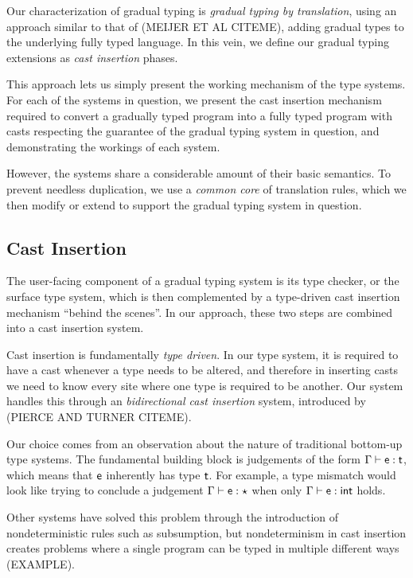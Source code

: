 \documentclass[preprint]{sigplanconf}
\newcommand{\e}{\M{\xt{e}}}
\renewcommand{\t}{\M{\xt{t}}}
\newcommand{\any}{\M{\star}}
\newcommand{\M}[1]{\ensuremath{#1}\xspace}
\newcommand{\xt}[1]{{\sf{#1}}\xspace}
\newcommand{\E}{\M{\Gamma}}
\begin{document}
Our characterization of gradual typing is \emph{gradual typing by translation},
using an approach similar to that of (MEIJER ET AL CITEME), adding gradual
types to the underlying fully typed language. In this vein,
we define our gradual typing extensions as \emph{cast insertion} phases.

This approach lets us simply present the working mechanism of the type
systems. For each of the systems in question, we present the cast insertion
mechanism required to convert a gradually typed program into a fully typed
program with casts respecting the guarantee of the gradual typing system in
question, and demonstrating the workings of each system.

However, the systems share a considerable amount of their basic semantics.
To prevent needless duplication, we use a \emph{common core} of translation
rules, which we then modify or extend to support the gradual typing system in
question.

\subsection{Cast Insertion}

The user-facing component of a gradual typing system is its type checker,
or the surface type system, which is then complemented by a type-driven
cast insertion mechanism ``behind the scenes''. In our approach, these two
steps are combined into a cast insertion system.

Cast insertion is fundamentally \emph{type driven}. In our type system, it is
required to have a cast whenever a type needs to be altered, and therefore in
inserting casts we need to know every site where one type is required to be another.
Our system handles this through an \emph{bidirectional cast insertion} system,
introduced by (PIERCE AND TURNER CITEME).

Our choice comes from an observation about the nature of traditional bottom-up type
systems. The fundamental building block is judgements of the form $\E \vdash \e : \t$, 
which means that $\e$ inherently has type $\t$. For example, a type mismatch
would look like trying to conclude a judgement $\E \vdash \e : \any$ when only
$\E \vdash \e : \xt{int}$ holds.

Other systems have solved this problem through the introduction of nondeterministic
rules such as subsumption, but nondeterminism in cast insertion creates problems
where a single program can be typed in multiple different ways (EXAMPLE).
\end{document}

